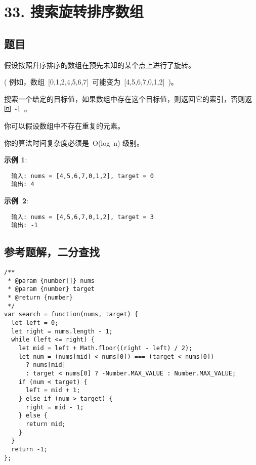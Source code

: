 \newpage
\section{33. 搜索旋转排序数组}
\label{leetcode:33}

\subsection{题目}

假设按照升序排序的数组在预先未知的某个点上进行了旋转。

( 例如，数组 [0,1,2,4,5,6,7] 可能变为 [4,5,6,7,0,1,2] )。

搜索一个给定的目标值，如果数组中存在这个目标值，则返回它的索引，否则返回 -1 。

你可以假设数组中不存在重复的元素。

你的算法时间复杂度必须是 O(log n) 级别。

\textbf{示例 1}:

\begin{verbatim}
  输入: nums = [4,5,6,7,0,1,2], target = 0
  输出: 4
\end{verbatim}

\textbf{示例 2}:

\begin{verbatim}
  输入: nums = [4,5,6,7,0,1,2], target = 3
  输出: -1
\end{verbatim}

\subsection{参考题解，二分查找}

\begin{verbatim}
/**
 * @param {number[]} nums
 * @param {number} target
 * @return {number}
 */
var search = function(nums, target) {
  let left = 0;
  let right = nums.length - 1;
  while (left <= right) {
    let mid = left + Math.floor((right - left) / 2);
    let num = (nums[mid] < nums[0]) === (target < nums[0])
      ? nums[mid]
      : target < nums[0] ? -Number.MAX_VALUE : Number.MAX_VALUE;
    if (num < target) {
      left = mid + 1;
    } else if (num > target) {
      right = mid - 1;
    } else {
      return mid;
    }
  }
  return -1;
};
\end{verbatim}
